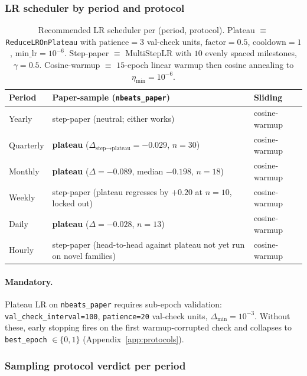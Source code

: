 \documentclass{article}
\begin{document}
\subsubsection{LR scheduler by period and protocol}
\label{app:hyperparams:lr}

\begin{table}[h]
\centering
\small
\caption{Recommended LR scheduler per (period, protocol). Plateau $\equiv$ \texttt{ReduceLROnPlateau} with $\text{patience}=3$ val-check units, $\text{factor}=0.5$, $\text{cooldown}=1$, $\text{min\_lr}=10^{-6}$. Step-paper $\equiv$ MultiStepLR with $10$ evenly spaced milestones, $\gamma=0.5$. Cosine-warmup $\equiv$ $15$-epoch linear warmup then cosine annealing to $\eta_{\min}=10^{-6}$.}
\label{tab:lr_per_period}
\begin{tabular}{@{}lll@{}}
\toprule
Period & Paper-sample (\texttt{nbeats\_paper}) & Sliding \\
\midrule
Yearly    & step-paper (neutral; either works) & cosine-warmup \\
Quarterly & \textbf{plateau} ($\Delta_{\text{step}\to\text{plateau}}=-0.029$, $n=30$) & cosine-warmup \\
Monthly   & \textbf{plateau} ($\Delta=-0.089$, median $-0.198$, $n=18$) & cosine-warmup \\
Weekly    & step-paper (plateau regresses by $+0.20$ at $n=10$, locked out) & cosine-warmup \\
Daily     & \textbf{plateau} ($\Delta=-0.028$, $n=13$) & cosine-warmup \\
Hourly    & step-paper (head-to-head against plateau not yet run on novel families) & cosine-warmup \\
\bottomrule
\end{tabular}
\end{table}

\paragraph{Mandatory.} Plateau LR on \texttt{nbeats\_paper} requires sub-epoch validation: \texttt{val\_check\_interval=100}, \texttt{patience=20} val-check units, $\Delta_{\min}=10^{-3}$. Without these, early stopping fires on the first warmup-corrupted check and collapses to \texttt{best\_epoch} $\in \{0, 1\}$ (Appendix~\ref{app:protocols}).

\subsubsection{Sampling protocol verdict per period}
\label{app:hyperparams:sampling}
\end{document}
